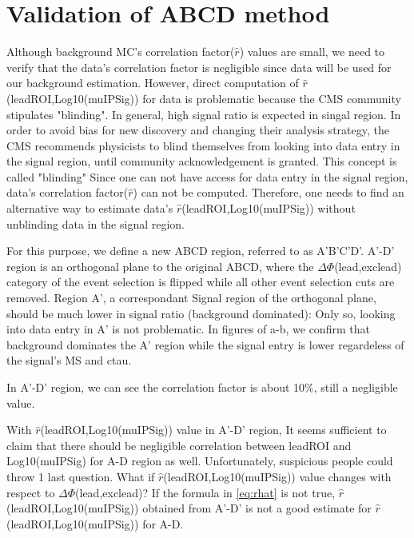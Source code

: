 \section{Validation of ABCD method}

Although background MC's correlation factor($\hat{r}$) values are small, we need to verify that the data's correlation factor is negligible since data will be used for our background estimation.
However, direct computation of $\hat{r}$(leadROI,Log10(muIPSig)) for data is problematic because the CMS community stipulates "blinding".
In general, high signal ratio is expected in singal region.
In order to avoid bias for new discovery and changing their analysis strategy, the CMS recommends physicists to blind themselves from looking into data entry in the signal region, until community acknowledgement is granted.
This concept is called "blinding"
Since one can not have access for data entry in the signal region, data's correlation factor($\hat{r}$) can not be computed. 
Therefore, one needs to find an alternative way to estimate data's $\hat{r}$(leadROI,Log10(muIPSig)) without unblinding data in the signal region.

For this purpose, we define a new ABCD region, referred to as A'B'C'D'.
A'-D' region is an orthogonal plane to the original ABCD, where the $\Delta\Phi$(lead,exclead) category of the event selection is flipped while all other event selection cuts are removed.
Region A', a correspondant Signal region of the orthogonal plane, should be much lower in signal ratio (background dominated): Only so, looking into data entry in A' is not problematic. 
In figures of a-b, we confirm that background dominates the A' region while the signal entry is lower regardeless of the signal's MS and ctau.





In A'-D' region, we can see the correlation factor is about 10\%, still a negligible value. 


With $\hat{r}$(leadROI,Log10(muIPSig)) value in A'-D' region, It seems sufficient to claim that there should be negligible correlation between leadROI and Log10(muIPSig) for A-D region as well.
Unfortunately, suspicious people could throw 1 last question.
What if $\hat{r}$(leadROI,Log10(muIPSig)) value changes with respect to $\Delta\Phi$(lead,exclead)?
If the formula in \ref{eq:rhat} is not true, $\hat{r}$(leadROI,Log10(muIPSig)) obtained from A'-D' is not a good estimate for $\hat{r}$(leadROI,Log10(muIPSig)) for A-D.

